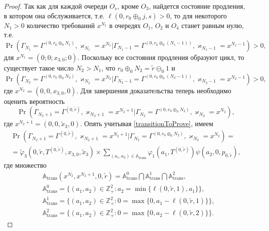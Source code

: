 \documentclass[a4paper,12pt,russian]{extarticle}
\begin{document}
\begin{proof}
Так как для каждой очереди $O_s$, кроме $O_3$, найдется состояние продления, в котором она обслуживается, т.е. $\ell(0,r_0\oplus_{0}j,s)>0$, то для некоторого $N_1>0$ количество требований $x^{N_1}$ в очередях $O_1$, $O_2$ и $O_4$ станет равным нулю, т.е. 
\begin{equation*}
\Pr (\Gamma_{N_1}=\Gamma^{(0,r_0\oplus_{0}N_1)},\varkappa_{N_1}=x^{N_1} | \Gamma_{N_1-1}=\Gamma^{(0,r_0\oplus_{0}(N_1-1))},\varkappa_{N_1-1}=x^{N_1-1}) > 0,
\end{equation*}
для $x^{N_1}  =\left(0;0; x_{3,0};0\right)$. Поскольку все состояния продления образуют цикл, то существует такое число $N_2>N_1$, что $r_0 \oplus_0  N_2 = \tilde{r} \ominus_0 1$ и 
\begin{equation*}
\Pr (\Gamma_{N_2}=\Gamma^{(0,r_0\oplus_{0}N_2)},\varkappa_{N_2}=x^{N_2} | \Gamma_{N_2-1}=\Gamma^{(0,r_0\oplus_{0}(N_2-1))},\varkappa_{N_2-1}=x^{N_2-1}) > 0,
\end{equation*}
где $x^{N_2} = (0,0,x_{3,0},0)$.
Для завершения доказательства теперь необходимо оценить вероятность 
\begin{equation*}
\Pr (\Gamma_{N_2+1}=\Gamma^{(0,\tilde{r})},\varkappa_{N_2+1}= x^{N_2+1} | \Gamma_{N_2}=\Gamma^{(0,r_0\oplus_{0}N_2)},\varkappa_{N_2}=x^{N_2}),
\end{equation*}
где $x^{N_2+1} = (0,0,\tilde{x}_3,0)$.
Опять учитывая \eqref{transitionToProve}, имеем
\begin{multline*}
\Pr (\Gamma_{N_2+1}=\Gamma^{(0,\tilde{r})},\varkappa_{N_2+1}=x^{N_2+1} | \Gamma_{N_2}=\Gamma^{(0,r_0\oplus_{0}N_2)},\varkappa_{N_2}=x^{N_2})=\\
=\widetilde{\varphi}_3(0,\tilde{r},T^{(0,\tilde{r})},x_{3,0},\tilde{x}_3)
\times
\sum_{(a_1,a_2)\in {\mathbb A}_{\mathrm{trans}}}\varphi_1(a_1,T^{(0,\tilde{r})})  \psi(a_2,0, p_{0,\tilde{r}}),
\end{multline*}
где множество 
\begin{align*}
&{\mathbb A}_{\mathrm{trans}}(x^{N_2},x^{N_2+1},0,\tilde{r}) = {\mathbb A}_{\mathrm{trans}}^0 \bigcap {\mathbb A}_{\mathrm{trans}}^1\bigcap {\mathbb A}_{\mathrm{trans}}^2,\\
&{\mathbb A}_{\mathrm{trans}}^0 = \{(a_1,a_2) \in \mathbb{Z}_+^2 \colon a_2 = \min{\{\ell(0,\tilde{r},1), a_1}\} \},\\
&{\mathbb A}_{\mathrm{trans}}^1 = \{(a_1,a_2) \in \mathbb{Z}_+^2 \colon 0=\max{\{0,a_1-\ell(0,\tilde{r},1)\}}\},\\
 &{\mathbb A}_{\mathrm{trans}}^2= \{(a_1,a_2) \in \mathbb{Z}_+^2 \colon  0=\max{\{0,a_2-\ell(0,\tilde{r},2)\}}\}.

\end{align*}
\end{proof}
\end{document}
